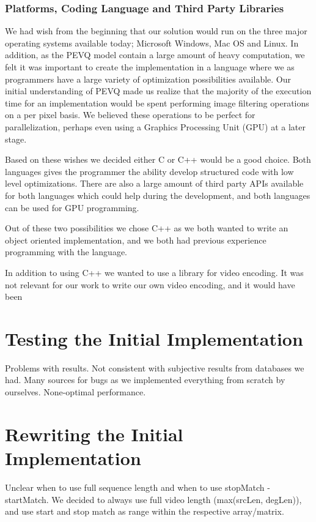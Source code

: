 \subsection{Platforms, Coding Language and Third Party Libraries}
We had wish from the beginning that our solution would run on the three major operating systems available today; Microsoft Windows, Mac OS and Linux. In addition, as the PEVQ model contain a large amount of heavy computation, we felt it was important to create the implementation in a language where we as programmers have a large variety of optimization possibilities available. Our initial understanding of PEVQ made us realize that the majority of the execution time for an implementation would be spent performing image filtering operations on a per pixel basis. We believed these operations to be perfect for parallelization, perhaps even using a Graphics Processing Unit (GPU) at a later stage.

Based on these wishes we decided either C or C++ would be a good choice. Both languages gives the programmer the ability develop structured code with low level optimizations. There are also a large amount of third party APIs available for both languages which could help during the development, and both languages can be used for GPU programming. 

Out of these two possibilities we chose C++ as we both wanted to write an object oriented implementation, and we both had previous experience programming with the language. 

In addition to using C++ we wanted to use a library for video encoding. It was not relevant for our work to write our own video encoding, and it would have been 



\chapter{Testing the Initial Implementation}
       
Problems with results. Not consistent with subjective results from databases we had.
Many sources for bugs as we implemented everything from scratch by ourselves. 
None-optimal performance.

\chapter{Rewriting the Initial Implementation}
Unclear when to use full sequence length and when to use stopMatch - startMatch. We decided to always use full video length (max(srcLen, degLen)), and use start and stop match as range within the respective array/matrix.


